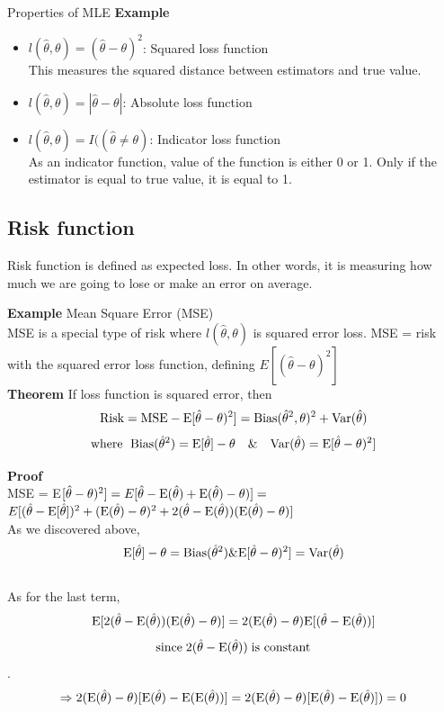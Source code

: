 \documentclass[12pt]{article}
\newcommand{\E}{{\rm E}}
\begin{document}
\begin{section}{Properties of MLE}
\textbf{Example}
\begin{itemize}
	\item $l(\hat{\theta},\theta) = (\hat{\theta}-\theta)^2$: Squared loss function\\
    This measures the squared distance between estimators and true value.
    \item $l(\hat{\theta},\theta) = |\hat{\theta}-\theta|$: Absolute loss function
    \item $l(\hat{\theta},\theta) = I((\hat{\theta} \neq \theta)$: Indicator loss function\\
    As an indicator function, value of the function is either 0 or 1. Only if the estimator is equal to true value, it is equal to 1.
\end{itemize}
\subsection{Risk function}
Risk function is defined as expected loss. In other words, it is measuring how much we are going to lose or make an error on average. 

\textbf{Example} Mean Square Error (MSE)\\
MSE is a special type of risk where $l(\hat{\theta},\theta)$ is squared error loss.
MSE = risk with the squared error loss function, defining $E[(\hat{\theta}-\theta)^2]$\\



\textbf{Theorem} If loss function is squared error, then
$$\text{Risk}=\text{MSE} - \E [\hat{\theta}-\theta)^2] = \text{Bias}(\hat{\theta}^2,\theta)^2 + \text{Var}(\hat{\theta})$$
$$\text{where \;Bias}(\hat{\theta}^2) = \E [\hat{\theta}] - \theta \quad\&\quad \text{Var}(\hat{\theta}) = \E [\hat{\theta}-\theta)^2]$$

\textbf{Proof} \\
MSE = E$[\hat{\theta}-\theta)^2] = E[\hat{\theta}-\E (\hat{\theta}) + \E (\hat{\theta}) - \theta)]=$\\ 
$E[(\hat{\theta} - \E [\hat{\theta}])^2 + (\E (\hat{\theta})-\theta)^2 + 2(\hat{\theta} - \E (\hat{\theta}))(\E (\hat{\theta}) - \theta)]$\\


As we discovered above, 
$$\E [\hat{\theta}] - \theta = \text{Bias}(\hat{\theta}^2) \& \E [\hat{\theta}-\theta)^2] = \text{Var}(\hat{\theta})$$ \\
As for the last term, $$\E[2(\hat{\theta} - \E (\hat{\theta})) (\E (\hat{\theta}) - \theta)] = 2(\E (\hat{\theta}) - \theta) \E[(\hat{\theta} - \E(\hat{\theta}))]$$ $$\text{since}\; 2(\hat{\theta} - \E (\hat{\theta})) \; \text{is constant}$$.
$$\Rightarrow 2(\E (\hat{\theta}) - \theta) [\E(\hat{\theta}) - \E(\E(\hat{\theta}))] = 2(\E (\hat{\theta}) - \theta) [\E(\hat{\theta}) -\E(\hat{\theta})]) = 0$$\\



\end{section}
\end{document}
